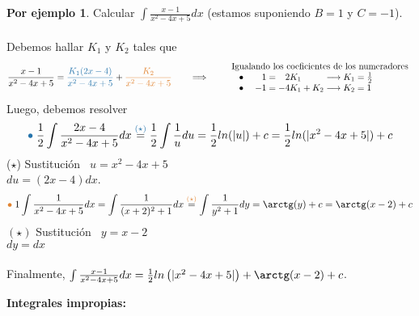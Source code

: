 \documentclass{article}
\theoremstyle{definition}
\theoremstyle{definition}
\newtheorem*{ej}{Por ejemplo}
\theoremstyle{remark}
\newcommand\bl{$\bullet\;$}
\begin{document}
\begin{ej}
Calcular $\int{\frac{x-1}{x^2-4x+5}dx}$  \quad (estamos suponiendo $B=1$ y $C=-1$). \\\\
Debemos hallar $K_1$ y $K_2$ tales que \[
\frac{x-1}{x^2-4x+5}
=
\textcolor{azulp2}{\frac{K_1(2x-4)}{x^2-4x+5}}
+
\textcolor{rojop2}{\frac{K_2}{x^2-4x+5}}
\quad \quad \Longrightarrow \quad \quad \begin{array}{l}
\text{Igualando los coeficientes de los numeradores} \\
\;\;\; $\bl$ \quad \phantom{-}1=\phantom{-}2K_1 \phantom{+k_2+}\longrightarrow K_1=\frac{1}{2} \\
\;\;\; $\bl$ \quad -1=-4K_1+K_2 \longrightarrow K_2=1
\end{array}
\]
Luego, debemos resolver \[
\textcolor{azulp2}{\bullet} \; \frac{1}{2}\int{\frac{2x-4}{x^2-4x+5}dx}
\overset{\textcolor{azulp2}{(\star)}}{=}
\frac{1}{2} \int{\frac{1}{u}du}
=
\frac{1}{2} ln(|u|)+c
=
\frac{1}{2} ln(|x^2-4x+5|)+c
\]
\textcolor{azulp2}{($\star$)} Sustitución $\phantom{d}u=x^2-4x+5$ \\
 $du=(2x-4)dx$.
\[
\textcolor{rojop2}{\bullet} \; 1 \int{\frac{1}{x^2-4x+5}dx}
=
\int{\frac{1}{(x+2)^2+1}dx}
\overset{\textcolor{rojop2}{(\star)}}{=}
\int{\frac{1}{y^2+1}dy}
=
\arctg(y) + c
=
\arctg(x-2)+c
\]
\textcolor{rojop2}{$(\star)$} Sustitución $\phantom{d}y=x-2$ \\
 $dy=dx$
\\\\
Finalmente, $\int{\frac{x-1}{x^2-4x+5}dx}
=
\frac{1}{2}ln\left(|x^2-4x+5|\right)
+
\arctg(x-2)+c$.
\end{ej}

\begin{center}
\textbf{Integrales impropias:}
\end{center}
\end{document}
